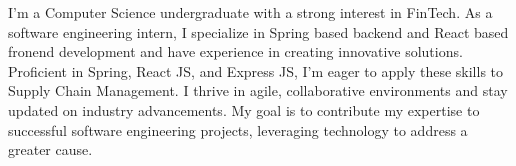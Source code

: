 

\begin{cvparagraph}

    I'm a Computer Science undergraduate with a strong interest in FinTech. As a software engineering intern, I specialize in Spring based backend and React based fronend development and have experience in creating innovative solutions. Proficient in Spring, React JS, and Express JS, I'm eager to apply these skills to Supply Chain Management. I thrive in agile, collaborative environments and stay updated on industry advancements. My goal is to contribute my expertise to successful software engineering projects, leveraging technology to address a greater cause.
\end{cvparagraph}
